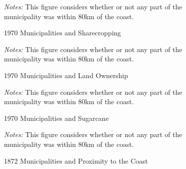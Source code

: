 \documentclass{article}
\begin{document}
\begin{figure}[h!]
  \caption{1970 Municipalities and Sharecropping}
  \begin{center}
  \textit{Notes:} This figure considers whether or not any part of the municipality was within 80km of the coast.
  \end{center}
  \label{fig:sharecropping_1970}
\end{figure}

\begin{figure}
  \caption{1970 Municipalities and Land Ownership}
  \begin{center}
  \textit{Notes:} This figure considers whether or not any part of the municipality was within 80km of the coast.
  \end{center}
  \label{fig:land_ownership_1970}
\end{figure}

\begin{figure}
  \caption{1970 Municipalities and Sugarcane}
  \begin{center}
  \textit{Notes:} This figure considers whether or not any part of the municipality was within 80km of the coast.
  \end{center}
  \label{fig:sugarcane_1970}
\end{figure}

\begin{figure}
  \caption{1872 Municipalities and Proximity to the Coast}
  \begin{center}
  \textit{Notes:} This figure considers whether or not any part of the municipality was within 80km of the coast.
  \end{center}
  \label{fig:cotton_1970}
\end{figure}
\end{document}
